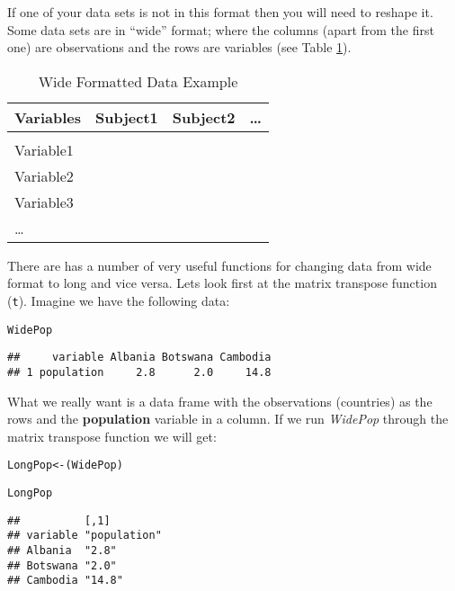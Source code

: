 \noindent If one of your data sets is not in this format then you will need to reshape it. Some data sets are in ``wide'' format; where the columns (apart from the first one) are observations and the rows are variables (see Table \ref{ExampleWide}).

\begin{table}[h!]
	\caption{Wide Formatted Data Example}
	\label{ExampleWide}
	\begin{tabular}{l c c c}
		\hline 
		Variables & Subject1 & Subject2 & \ldots \\
		\hline \\[0.1cm]
		Variable1 & & & \\[0.25cm]
		Variable2 & & & \\[0.25cm]
		Variable3 & & & \\[0.25cm]
		\ldots & & & \\[0.25cm]
		\hline
	\end{tabular}
\end{table}

There are  has a number of very useful functions for changing data from wide format to long and vice versa. Lets look first at the matrix transpose function (\texttt{t}). Imagine we have the following data:




\begin{knitrout}
\color{fgcolor}\begin{kframe}
\begin{alltt}
WidePop
\end{alltt}
\begin{verbatim}
##     variable Albania Botswana Cambodia
## 1 population     2.8      2.0     14.8
\end{verbatim}
\end{kframe}
\end{knitrout}


\noindent What we really want is a data frame with the observations (countries) as the rows and the \textbf{population} variable in a column. If we run \emph{WidePop} through the matrix transpose function we will get:

\begin{knitrout}
\color{fgcolor}\begin{kframe}
\begin{alltt}
LongPop <- (WidePop)

LongPop
\end{alltt}
\begin{verbatim}
##          [,1]        
## variable "population"
## Albania  "2.8"       
## Botswana "2.0"       
## Cambodia "14.8"
\end{verbatim}
\end{kframe}
\end{knitrout}


